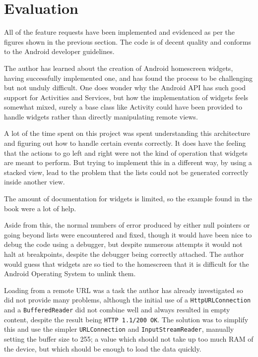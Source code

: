 \documentclass[11pt, a4paper]{article}
\begin{document}
\section{Evaluation}

All of the feature requests have been implemented and evidenced as per the 
figures shown in the previous section. The code is of decent quality and 
conforms to the Android developer guidelines.

The author has learned about the creation of Android homescreen widgets, having
successfully implemented one, and has found the process to be challenging but 
not unduly difficult. One does wonder why the Android API has such good support
for Activities and Services, but how the implementation of widgets feels 
somewhat mixed, surely a base class like Activity could have been provided to 
handle widgets rather than directly manipulating remote views.

A lot of the time spent on this project was spent understanding this 
architecture and figuring out how to handle certain events correctly. It does 
have the feeling that the actions to go left and right were not the kind of
operation that widgets are meant to perform. But trying to implement this in a
different way, by using a stacked view, lead to the problem that the lists
could not be generated correctly inside another view.

The amount of documentation for widgets is limited, so the example found in the
book\cite{murphy2009android} were a lot of help.

Aside from this, the normal numbers of error produced by either null pointers
or going beyond lists were encountered and fixed, though it would have been 
nice to debug the code using a debugger, but despite numerous attempts it would
not halt at breakpoints, despite the debugger being correctly attached. The
author would guess that widgets are so tied to the homescreen that it is 
difficult for the Android Operating System to unlink them.

Loading from a remote URL was a task the author has already investigated so did
not provide many problems, although the initial use of a 
\texttt{HttpURLConnection} and a \texttt{BufferedReader} did not combine well
and always resulted in empty content, despite the result being 
\texttt{HTTP 1.1/200 OK}. The solution was to simplify this and use the simpler
\texttt{URLConnection} and \texttt{InputStreamReader}, manually setting the 
buffer size to 255; a value which should not take up too much RAM
of the device, but which should be enough to load the data quickly.
\end{document}
